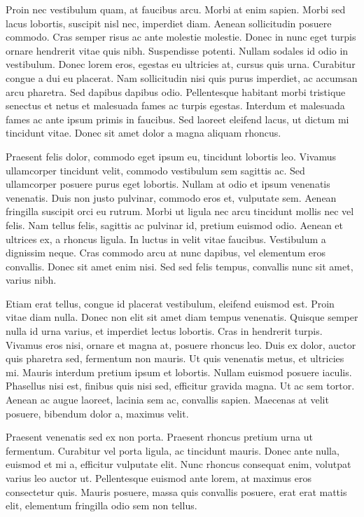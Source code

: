 \documentclass[12pt, letterpaper,twocolumn]{article}
\begin{document}
Proin nec vestibulum quam, at faucibus arcu. Morbi at enim sapien. Morbi sed lacus lobortis, suscipit nisl nec, imperdiet diam. Aenean sollicitudin posuere commodo. Cras semper risus ac ante molestie molestie. Donec in nunc eget turpis ornare hendrerit vitae quis nibh. Suspendisse potenti. Nullam sodales id odio in vestibulum. Donec lorem eros, egestas eu ultricies at, cursus quis urna. Curabitur congue a dui eu placerat. Nam sollicitudin nisi quis purus imperdiet, ac accumsan arcu pharetra. Sed dapibus dapibus odio. Pellentesque habitant morbi tristique senectus et netus et malesuada fames ac turpis egestas. Interdum et malesuada fames ac ante ipsum primis in faucibus. Sed laoreet eleifend lacus, ut dictum mi tincidunt vitae. Donec sit amet dolor a magna aliquam rhoncus.

Praesent felis dolor, commodo eget ipsum eu, tincidunt lobortis leo. Vivamus ullamcorper tincidunt velit, commodo vestibulum sem sagittis ac. Sed ullamcorper posuere purus eget lobortis. Nullam at odio et ipsum venenatis venenatis. Duis non justo pulvinar, commodo eros et, vulputate sem. Aenean fringilla suscipit orci eu rutrum. Morbi ut ligula nec arcu tincidunt mollis nec vel felis. Nam tellus felis, sagittis ac pulvinar id, pretium euismod odio. Aenean et ultrices ex, a rhoncus ligula. In luctus in velit vitae faucibus. Vestibulum a dignissim neque. Cras commodo arcu at nunc dapibus, vel elementum eros convallis. Donec sit amet enim nisi. Sed sed felis tempus, convallis nunc sit amet, varius nibh.

Etiam erat tellus, congue id placerat vestibulum, eleifend euismod est. Proin vitae diam nulla. Donec non elit sit amet diam tempus venenatis. Quisque semper nulla id urna varius, et imperdiet lectus lobortis. Cras in hendrerit turpis. Vivamus eros nisi, ornare et magna at, posuere rhoncus leo. Duis ex dolor, auctor quis pharetra sed, fermentum non mauris. Ut quis venenatis metus, et ultricies mi. Mauris interdum pretium ipsum et lobortis. Nullam euismod posuere iaculis. Phasellus nisi est, finibus quis nisi sed, efficitur gravida magna. Ut ac sem tortor. Aenean ac augue laoreet, lacinia sem ac, convallis sapien. Maecenas at velit posuere, bibendum dolor a, maximus velit.

Praesent venenatis sed ex non porta. Praesent rhoncus pretium urna ut fermentum. Curabitur vel porta ligula, ac tincidunt mauris. Donec ante nulla, euismod et mi a, efficitur vulputate elit. Nunc rhoncus consequat enim, volutpat varius leo auctor ut. Pellentesque euismod ante lorem, at maximus eros consectetur quis. Mauris posuere, massa quis convallis posuere, erat erat mattis elit, elementum fringilla odio sem non tellus.
\end{document}
